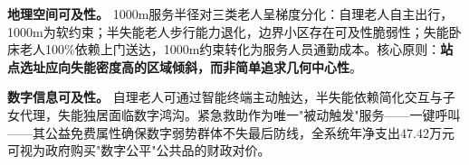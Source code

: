 \textbf{地理空间可及性。} 1000m服务半径对三类老人呈梯度分化：自理老人自主出行，1000m为软约束；半失能老人步行能力退化，边界小区存在可及性脆弱性；失能卧床老人100\%依赖上门送达，1000m约束转化为服务人员通勤成本。核心原则：\textbf{站点选址应向失能密度高的区域倾斜，而非简单追求几何中心性}。

\textbf{数字信息可及性。} 自理老人可通过智能终端主动触达，半失能依赖简化交互与子女代理，失能独居面临数字鸿沟。紧急救助作为唯一"被动触发"服务——一键呼叫——其公益免费属性确保数字弱势群体不失最后防线，全系统年净支出47.42万元可视为政府购买"数字公平"公共品的财政对价。
